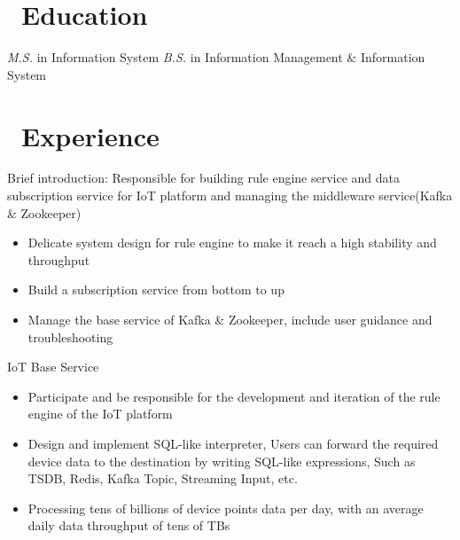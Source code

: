 \documentclass{resume}
\begin{document}



\section{\faGraduationCap\ Education}
\textit{M.S.} in Information System
\textit{B.S.} in Information Management \& Information System

\section{\faUsers\ Experience }
\role{Senior Software Engineer}{}
Brief introduction: Responsible for building rule engine service and data subscription service for IoT platform and managing the middleware service(Kafka \& Zookeeper)
\begin{itemize}
  \item Delicate system design for rule engine to make it reach a high stability and throughput
  \item Build a subscription service from bottom to up
  \item Manage the base service of Kafka \& Zookeeper, include user guidance and troubleshooting
\end{itemize}

IoT Base Service
\begin{itemize}
  \item Participate and be responsible for the development and iteration of the rule engine of the IoT platform
  \item Design and implement SQL-like interpreter, Users can forward the required device data to the destination by writing SQL-like expressions, Such as TSDB, Redis, Kafka Topic, Streaming Input, etc.
  \item Processing tens of billions of device points data per day, with an average daily data throughput of tens of TBs
\end{itemize}
\end{document}
